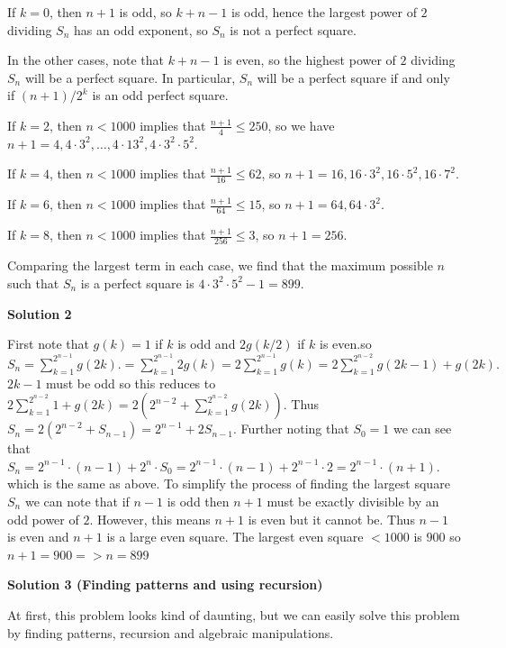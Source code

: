 \begin{enumerate}
 If $k=0$, then $n+1$ is odd, so $k+n-1$ is odd, hence the largest power of $2$ dividing $S_n$ has an odd exponent, so $S_n$ is not a perfect square.

 In the other cases, note that $k+n-1$ is even, so the highest power of $2$ dividing $S_n$ will be a perfect square. In particular, $S_n$ will be a perfect square if and only if $(n+1)/2^{k}$ is an odd perfect square.

 If $k=2$, then $n<1000$ implies that $\frac{n+1}{4} \le 250$, so we have $n+1 = 4, 4 \cdot 3^2, \ldots, 4 \cdot 13^2, 4\cdot 3^2 \cdot 5^2$.

 If $k=4$, then $n<1000$ implies that $\frac{n+1}{16} \le 62$, so $n+1 = 16, 16 \cdot 3^2, 16 \cdot 5^2, 16 \cdot 7^2$.

 If $k=6$, then $n<1000$ implies that $\frac{n+1}{64}\le 15$, so $n+1=64,64\cdot 3^2$.

 If $k=8$, then $n<1000$ implies that $\frac{n+1}{256}\le 3$, so $n+1=256$.

 Comparing the largest term in each case, we find that the maximum possible $n$ such that $S_n$ is a perfect square is $4\cdot 3^2 \cdot 5^2 - 1 = \boxed{899}$.

 



\textbf{Solution 2}

First note that $g(k)=1$ if $k$ is odd and $2g(k/2)$ if $k$ is even.so $S_n=\sum_{k=1}^{2^{n-1}}g(2k). = \sum_{k=1}^{2^{n-1}}2g(k) = 2\sum_{k=1}^{2^{n-1}}g(k) = 2\sum_{k=1}^{2^{n-2}} g(2k-1)+g(2k).$$2k-1$ must be odd so this reduces to $2\sum_{k=1}^{2^{n-2}}1+g(2k) = 2(2^{n-2}+\sum_{k=1}^{2^{n-2}}g(2k)).$  Thus $S_n=2(2^{n-2}+S_{n-1})=2^{n-1}+2S_{n-1}.$ Further noting that $S_0=1$ we can see that $S_n=2^{n-1}\cdot (n-1)+2^n\cdot S_0=2^{n-1}\cdot (n-1)+2^{n-1}\cdot2=2^{n-1}\cdot (n+1).$ which is the same as above.  To simplify the process of finding the largest square $S_n$ we can note that if $n-1$ is odd then $n+1$ must be exactly divisible by an odd power of $2$.  However, this means $n+1$ is even but it cannot be.  Thus $n-1$ is even and $n+1$ is a large even square.  The largest even square $< 1000$ is $900$ so $n+1= 900 => n= \boxed{899}$




\textbf{Solution 3 (Finding patterns and using recursion)}

At first, this problem looks kind of daunting, but we can easily solve this problem by finding patterns, recursion and algebraic manipulations.


\end{enumerate}
